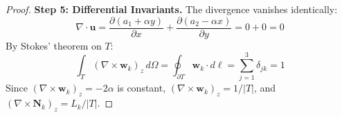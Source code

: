 \documentclass[11pt,a4paper]{article}
\begin{document}
\begin{proof}
\textbf{Step 5: Differential Invariants.} The divergence vanishes identically:
\begin{equation}
    \nabla \cdot \mathbf{u} = \frac{\partial (a_1 + \alpha y)}{\partial x} + \frac{\partial (a_2 - \alpha x)}{\partial y} = 0 + 0 = 0
\end{equation}
By Stokes' theorem on $T$:
\begin{equation}
    \int_T (\nabla \times \mathbf{w}_k)_z \, d\Omega = \oint_{\partial T} \mathbf{w}_k \cdot d\boldsymbol{\ell} = \sum_{j=1}^3 \delta_{jk} = 1
\end{equation}
Since $(\nabla \times \mathbf{w}_k)_z = -2\alpha$ is constant, $(\nabla \times \mathbf{w}_k)_z = 1/|T|$, and $(\nabla \times \mathbf{N}_k)_z = L_k / |T|$.
\end{proof}
\end{document}
